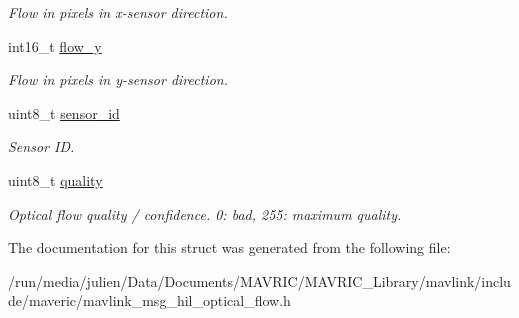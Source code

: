 \begin{DoxyCompactItemize}
\begin{DoxyCompactList}\small\item\em Flow in pixels in x-\/sensor direction. \end{DoxyCompactList}\item 
\hypertarget{struct____mavlink__hil__optical__flow__t_a39c0b66d152bf2967aff1b505963dbbe}{int16\+\_\+t \hyperlink{struct____mavlink__hil__optical__flow__t_a39c0b66d152bf2967aff1b505963dbbe}{flow\+\_\+y}}\label{struct____mavlink__hil__optical__flow__t_a39c0b66d152bf2967aff1b505963dbbe}

\begin{DoxyCompactList}\small\item\em Flow in pixels in y-\/sensor direction. \end{DoxyCompactList}\item 
\hypertarget{struct____mavlink__hil__optical__flow__t_ac17ff8aa6f89d8bbed3915e21fb598a6}{uint8\+\_\+t \hyperlink{struct____mavlink__hil__optical__flow__t_ac17ff8aa6f89d8bbed3915e21fb598a6}{sensor\+\_\+id}}\label{struct____mavlink__hil__optical__flow__t_ac17ff8aa6f89d8bbed3915e21fb598a6}

\begin{DoxyCompactList}\small\item\em Sensor I\+D. \end{DoxyCompactList}\item 
\hypertarget{struct____mavlink__hil__optical__flow__t_a039f754e2192a783b41d3f6c2f62fe7d}{uint8\+\_\+t \hyperlink{struct____mavlink__hil__optical__flow__t_a039f754e2192a783b41d3f6c2f62fe7d}{quality}}\label{struct____mavlink__hil__optical__flow__t_a039f754e2192a783b41d3f6c2f62fe7d}

\begin{DoxyCompactList}\small\item\em Optical flow quality / confidence. 0\+: bad, 255\+: maximum quality. \end{DoxyCompactList}\end{DoxyCompactItemize}


The documentation for this struct was generated from the following file\+:\begin{DoxyCompactItemize}
\item 
/run/media/julien/\+Data/\+Documents/\+M\+A\+V\+R\+I\+C/\+M\+A\+V\+R\+I\+C\+\_\+\+Library/mavlink/include/maveric/mavlink\+\_\+msg\+\_\+hil\+\_\+optical\+\_\+flow.\+h\end{DoxyCompactItemize}
